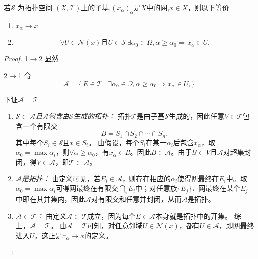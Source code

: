 \documentclass[lang=cn,a4paper,newtx,figureplace=section,tableplace=section]{elegantbook}
\begin{document}
\begin{proposition}
    若$\mathcal S$ 为拓扑空间 $(X,\mathcal{T})$上的子基,$(x_{\alpha})_{\alpha}$是$X$中的网,$x\in X$，则以下等价
    \begin{enumerate}
        \item $x_{\alpha}\to x$
        \item \begin{equation} \forall U\in\mathcal{N}(x)\text{且}U\in\mathcal S\;\exists \alpha_0\in\Omega,\alpha\ge \alpha_0\Rightarrow x_{\alpha}\in U. \end{equation}
    \end{enumerate}
\end{proposition}
\begin{proof}
    1$\to$2 显然

    2$\to$1  令
\begin{equation}
\mathcal A=\{\,E\in\mathcal{T}\mid \exists \alpha_0\in\Omega,\alpha\ge \alpha_0\Rightarrow x_{\alpha}\in U ,\}
\end{equation}

下证$\mathcal A=\mathcal T$

\begin{enumerate}
    \item \emph{$\mathcal S \subset \mathcal A$且$\mathcal A$包含由$\mathcal S$生成的拓扑：}  
    拓扑$\mathcal T$是由子基$\mathcal S$生成的，因此任意$V\in\mathcal T$包含一个有限交
    \[
    B = S_1 \cap S_2 \cap \cdots \cap S_n,
    \]
    其中每个$S_i\in\mathcal S$且$x\in S_i$。  
    由假设，每个$S_i$在某一$\alpha_i$后包含$x_\alpha$，取$\alpha_0=\max\alpha_i$，则$\forall\alpha\ge\alpha_0$，有$x_\alpha\in B$。因此$B\in\mathcal A$。由于$B\subset V$且$\mathcal A$对超集封闭，得$V\in\mathcal A$，即$\mathcal T\subset\mathcal A$。
    \item \emph{$\mathcal A$是拓扑：}  
    由定义可见，若$E_i \in \mathcal A$，则存在相应的$\alpha_i$使得网最终在$E_i$中。取$\alpha_0 = \max \alpha_i$可得网最终在有限交$\bigcap_i E_i$中；对任意族$\{E_j\}$，网最终在某个$E_j$中即在其并集内，因此$\mathcal A$对有限交和任意并封闭，从而$\mathcal A$是拓扑。
    \item \emph{$\mathcal A\subset\mathcal T$：}  
    由定义$\mathcal A\subset\mathcal T$成立，因为每个$E\in\mathcal A$本身就是拓扑中的开集。
    综上，$\mathcal A=\mathcal T$。
    由$\mathcal A=\mathcal T$可知，对任意邻域$U\in\mathcal N(x)$，都有$U\in\mathcal A$，即网最终进入$U$，这正是$x_\alpha\to x$的定义。
\end{enumerate}
    
\end{proof}
\end{document}

